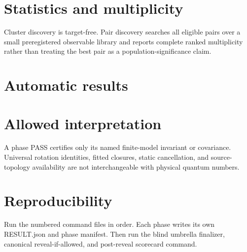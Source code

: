 \documentclass[11pt]{article}
\begin{document}
\section{Statistics and multiplicity}
Cluster discovery is target-free. Pair discovery searches all eligible pairs over a small preregistered observable library and reports complete ranked multiplicity rather than treating the best pair as a population-significance claim.
\section{Automatic results}
\section{Allowed interpretation}
A phase PASS certifies only its named finite-model invariant or covariance. Universal rotation identities, fitted closures, static cancellation, and source-topology availability are not interchangeable with physical quantum numbers.
\section{Reproducibility}
Run the numbered command files in order. Each phase writes its own RESULT.json and phase manifest. Then run the blind umbrella finalizer, canonical reveal-if-allowed, and post-reveal scorecard command.
\end{document}
